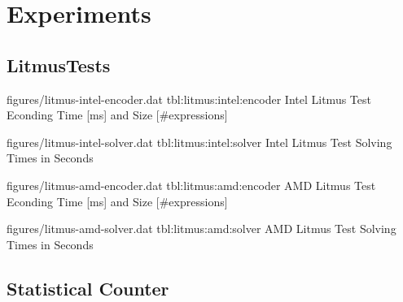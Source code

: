 
\section{Experiments}

\subsection{LitmusTests}


\EncoderStatsTable
  {figures/litmus-intel-encoder.dat}
  {tbl:litmus:intel:encoder}
  {Intel Litmus Test Econding Time [ms] and Size [\#expressions]}


\SolverStatsTable
  {figures/litmus-intel-solver.dat}
  {tbl:litmus:intel:solver}
  {Intel Litmus Test Solving Times in Seconds}

\newpage


\EncoderStatsTable
  {figures/litmus-amd-encoder.dat}
  {tbl:litmus:amd:encoder}
  {AMD Litmus Test Econding Time [ms] and Size [\#expressions]}


\SolverStatsTable
  {figures/litmus-amd-solver.dat}
  {tbl:litmus:amd:solver}
  {AMD Litmus Test Solving Times in Seconds}

\subsection{Statistical Counter}
